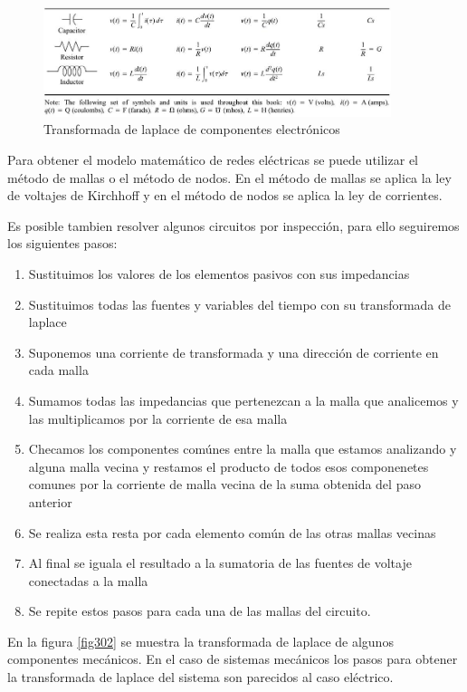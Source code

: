 \documentclass[12pt]{book}
\theoremstyle{definition}
\theoremstyle{remark}
\theoremstyle{plain}
\begin{document}
\begin{figure}
\centering
\includegraphics[width=4in]{circuitos.jpg}
\caption{Transformada de laplace de componentes electrónicos}
\label{fig301}
\end{figure}

Para obtener el modelo matemático de redes eléctricas se puede utilizar el método de mallas o el método de nodos. En el método de mallas se aplica la ley de voltajes de Kirchhoff y en el método de nodos se aplica la ley de corrientes.

Es posible tambien resolver algunos circuitos por inspección, para ello seguiremos los siguientes pasos:

\begin{enumerate}
\item Sustituimos los valores de los elementos pasivos con sus impedancias
\item Sustituimos todas las fuentes y variables del tiempo con su transformada de laplace
\item Suponemos una corriente de transformada y una dirección de corriente en cada malla
\item Sumamos todas las impedancias que pertenezcan a la malla que analicemos y las multiplicamos por la corriente de esa malla
\item Checamos los componentes comúnes entre la malla que estamos analizando y alguna malla vecina y restamos el producto de todos esos componenetes comunes por la corriente de malla vecina de la suma obtenida del paso anterior
\item Se realiza esta resta por cada elemento común de las otras mallas vecinas
\item Al final se iguala el resultado a la sumatoria de las  fuentes de voltaje conectadas a la malla
\item Se repite estos pasos para cada una de las mallas del circuito.
\end{enumerate}

En la figura \ref{fig302} se muestra la transformada de laplace de algunos componentes mecánicos. En el caso de sistemas mecánicos los pasos para obtener la transformada de laplace del sistema son parecidos al caso eléctrico.
\end{document}
